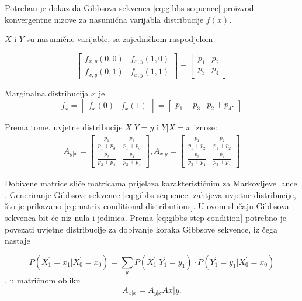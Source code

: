 Potreban je dokaz da Gibbsova sekvenca \eqref{eq:gibbs sequence} proizvodi konvergentne nizove za nasumična varijabla distribucije $f(x)$. 

$X$ i $Y$ su nasumične varijable, sa zajedničkom raspodjelom

\begin{equation}
\begin{bmatrix}
f_{x,y}(0,0) & f_{x,y}(1,0) \\
f_{x,y}(0,1) & f_{x,y}(1,1) 
\end{bmatrix} 
= 
\begin{bmatrix}
p_1 & p_2 \\
p_3 & p_4
\end{bmatrix}
\end{equation}

Marginalna distribucija $x$ je
\begin{equation}
f_x = \begin{bmatrix}
f_x(0) & f_x(1)
\end{bmatrix}
= \begin{bmatrix}
p_1 + p_3 & p_2 + p_4.
\end{bmatrix}
\end{equation}

Prema tome, uvjetne distribucije $X|Y=y$ i $Y|X=x$ iznose:
\begin{align} \label{eq:matrix conditional distributions}
A_{y|x} = \begin{bmatrix}
\frac{p_1}{p_1+p_3} & \frac{p_3}{p_1+p_3} \\
\frac{p_2}{p_2+p_4} & \frac{p_4}{p_2+p_4}
\end{bmatrix},
A_{x|y} = \begin{bmatrix}
\frac{p_1}{p_1+p_2} & \frac{p_2}{p_1+p_2} \\
\frac{p_3}{p_3+p_4} & \frac{p_4}{p_3+p_4}
\end{bmatrix}
\end{align}

Dobivene matrice sliče matricama prijelaza karakterističnim za Markovljeve lance \citep{gilks1996markov}. Generiranje Gibbsove sekvence \eqref{eq:gibbs sequence} zahtjeva uvjetne distribucije, što je prikazano \eqref{eq:matrix conditional distributions}. U ovom slučaju Gibbsova sekvenca bit će niz nula i jedinica. Prema \eqref{eq:gibbs step condition} potrebno je povezati uvjetne distribucije za dobivanje koraka Gibbsove sekvence, iz čega nastaje

\begin{equation}
P(X^{'}_{1}=x_1 | X^{'}_{0}=x_0) = \sum_{y} P(X^{'}_{1} | Y^{'}_{1}=y_1) \cdot P(Y^{'}_{1}=y_1|X^{'}_{0}=x_0)
\end{equation}, 
u matričnom obliku
\begin{equation}
A_{x|x} = A_{y|x}A{x|y}.
\end{equation}

